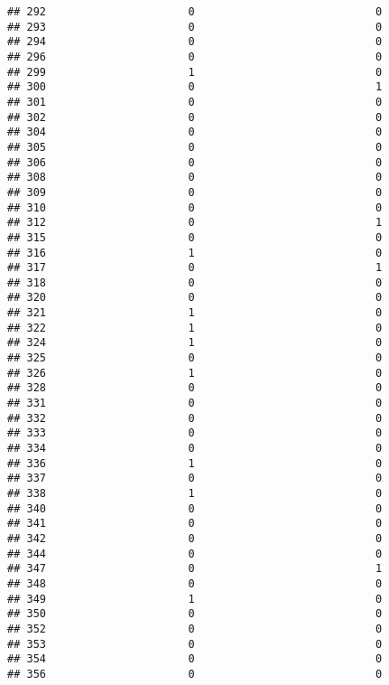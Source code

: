 \documentclass[
]{article}
\begin{document}
\begin{verbatim}
## 292                      0                            0
## 293                      0                            0
## 294                      0                            0
## 296                      0                            0
## 299                      1                            0
## 300                      0                            1
## 301                      0                            0
## 302                      0                            0
## 304                      0                            0
## 305                      0                            0
## 306                      0                            0
## 308                      0                            0
## 309                      0                            0
## 310                      0                            0
## 312                      0                            1
## 315                      0                            0
## 316                      1                            0
## 317                      0                            1
## 318                      0                            0
## 320                      0                            0
## 321                      1                            0
## 322                      1                            0
## 324                      1                            0
## 325                      0                            0
## 326                      1                            0
## 328                      0                            0
## 331                      0                            0
## 332                      0                            0
## 333                      0                            0
## 334                      0                            0
## 336                      1                            0
## 337                      0                            0
## 338                      1                            0
## 340                      0                            0
## 341                      0                            0
## 342                      0                            0
## 344                      0                            0
## 347                      0                            1
## 348                      0                            0
## 349                      1                            0
## 350                      0                            0
## 352                      0                            0
## 353                      0                            0
## 354                      0                            0
## 356                      0                            0

\end{verbatim}
\end{document}

